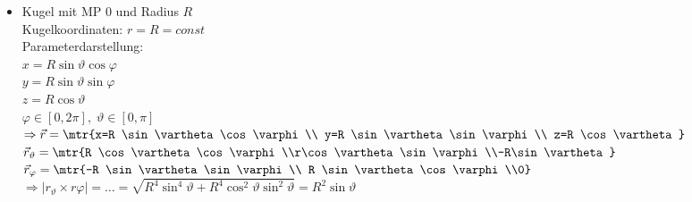 \begin{itemize}
\item Kugel mit MP $0$ und Radius $R$\\
Kugelkoordinaten: $r=R=const$\\
Parameterdarstellung: \\
$x=R \sin \vartheta \cos \varphi$\\
$y=R \sin \vartheta \sin \varphi$\\
$z=R \cos \vartheta$\\
$\varphi \in [0,2\pi], \; \vartheta\in [0,\pi]$\\
$\Rightarrow \vec{r}=\mtr{x=R \sin \vartheta \cos \varphi\\
y=R \sin \vartheta \sin \varphi\\
z=R \cos \vartheta}$\\
$\vec{r}_\vartheta=\mtr{R \cos \vartheta \cos \varphi\\r\cos\vartheta \sin \varphi\\-R\sin\vartheta}$\\
$\vec{r}_\varphi = \mtr{-R \sin \vartheta \sin \varphi \\ R \sin\vartheta \cos \varphi\\0}$\\
$\Rightarrow|r_\vartheta \times r\varphi|=\dots = \sqrt{R^4\sin^4\vartheta + R^4\cos^2\vartheta \sin^2 \vartheta}=R^2\sin\vartheta$
\end{itemize}

